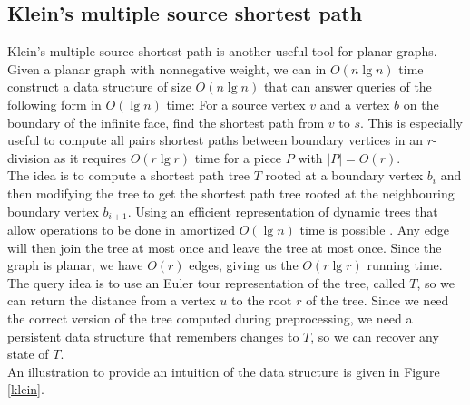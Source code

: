 \subsection{Klein's multiple source shortest path}\label{klein2}
Klein's multiple source shortest path \cite{klein2005multiple} is another useful tool for planar
graphs. Given a planar graph with nonnegative weight, we can in $O(n\lg n)$ time construct a data structure
of size $O(n \lg n)$ that can answer queries of the following form in $O(\lg n)$ time:
For a source vertex $v$ and a vertex $b$ on the boundary of the infinite face, find the
shortest path from $v$ to $s$. This is especially useful to compute all pairs shortest paths between boundary
vertices in an $r$-division as it requires $O(r\lg r)$ time for a piece $P$ with
$|P|=O(r)$. \\
The idea is to compute a shortest path tree $T$ rooted at a boundary vertex
$b_i$ and then modifying the tree to get the shortest path tree rooted at the
neighbouring boundary vertex $b_{i+1}$. Using an efficient representation of dynamic
trees that allow operations to be done in amortized $O(\lg n)$ time is possible
\cite{tarjan2005self}\cite{henzinger1999randomized}. Any edge will then join the tree at
most once and leave the tree at most once. Since the graph is planar, we have $O(r)$ edges,
giving us the $O(r\lg r)$ running time. \\
The query idea is to use an Euler tour representation of the tree, called $T$, so we can
return the distance from a vertex $u$ to the root $r$ of the tree. Since we need the
correct version of the tree computed during preprocessing, we need a persistent data
structure that remembers changes to $T$, so we can recover any state of $T$. \\
An illustration to provide an intuition of the data structure is given in Figure
\ref{klein}.

